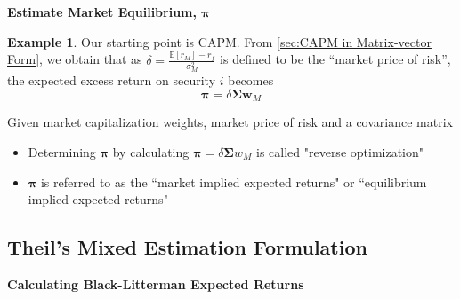 \documentclass[13pt]{article}
\theoremstyle{definition}
\newtheorem{example}[theorem]{Example}
\theoremstyle{remark}
\newenvironment{remark}
  {\pushQED{\qed}\renewcommand{\qedsymbol}{$\triangle$}\remarkx}
  {\popQED\endremarkx}
\begin{document}
{\color{C6}\textbf{Estimate Market Equilibrium, $\bm{\pi}$}}
\begin{example}
Our starting point is CAPM. From \cref{sec:CAPM in Matrix-vector Form}, we obtain that as $\delta=\frac{\mathbb{E}\left[r_{M}\right]-r_{f}}{\sigma_{M}^{2}}$ is defined to be the ``market price of risk'', the expected excess return on security $i$  becomes
$$
\bm{\pi}=\delta \mathbf{\Sigma} \bm{w}_{M}
$$
\end{example}
\begin{remark}
   Given market capitalization weights, market price of risk and a covariance matrix

\begin{itemize}
  \item Determining $\bm{\pi}$ by calculating $\bm{\pi}=\delta \mathbf{\Sigma} w_{M}$ is called "reverse optimization"

  \item $\bm{\pi}$ is referred to as the ``market implied expected returns" or ``equilibrium implied expected returns"
\end{itemize}
\end{remark}

\subsection{Theil's Mixed Estimation Formulation}
{\color{C6}\textbf{Calculating Black-Litterman Expected Returns}}
\end{document}

